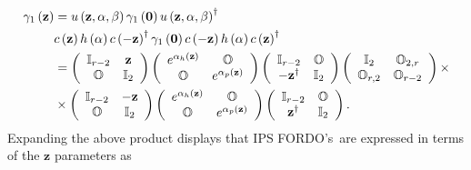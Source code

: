 \documentclass[aps,preprint]{revtex4}%
\begin{document}
\begin{align}
\gamma_{1}\left(  \mathbf{z}\right)   &  =u\left(  \mathbf{z,\alpha,\beta
}\right)  \gamma_{1}\left(  \mathbf{0}\right)  u\left(  \mathbf{z,\alpha
,\beta}\right)  ^{\dagger}\nonumber\\
&  c\left(  \mathbf{z}\right)  h\left(  \mathbf{\alpha}\right)  c\left(
-\mathbf{z}\right)  ^{\dagger}\gamma_{1}\left(  \mathbf{0}\right)  c\left(
-\mathbf{z}\right)  h\left(  \mathbf{\alpha}\right)  c\left(  \mathbf{z}%
\right)  ^{\dagger}\nonumber\\
&  =\left(
\begin{array}
[c]{cc}%
\mathbb{I}_{r-2} & \mathbf{z}\\
\mathbb{O} & \mathbb{I}_{2}%
\end{array}
\right)  \left(
\begin{array}
[c]{cc}%
e^{\mathbf{\alpha}_{h}\left(  \mathbf{z}\right)  } & \mathbb{O}\\
\mathbb{O} & e^{\mathbf{\alpha}_{p}\left(  \mathbf{z}\right)  }%
\end{array}
\right)  \left(
\begin{array}
[c]{cc}%
\mathbb{I}_{r-2} & \mathbb{O}\\
-\mathbf{z}^{\dagger} & \mathbb{I}_{2}%
\end{array}
\right)  \left(
\begin{array}
[c]{cc}%
\mathbb{I}_{2} & \mathbb{O}_{2,r}\\
\mathbb{O}_{r,2} & \mathbb{O}_{r-2}%
\end{array}
\right)  \times\nonumber\\
&  \times\left(
\begin{array}
[c]{cc}%
\mathbb{I}_{r-2} & -\mathbf{z}\\
\mathbb{O} & \mathbb{I}_{2}%
\end{array}
\right)  \left(
\begin{array}
[c]{cc}%
e^{\mathbf{\alpha}_{h}\left(  \mathbf{z}\right)  } & \mathbb{O}\\
\mathbb{O} & e^{\mathbf{\alpha}_{p}\left(  \mathbf{z}\right)  }%
\end{array}
\right)  \left(
\begin{array}
[c]{cc}%
\mathbb{I}_{r-2} & \mathbb{O}\\
\mathbf{z}^{\dagger} & \mathbb{I}_{2}%
\end{array}
\right)  .
\end{align}
Expanding the above product displays that IPS FORDO's\ are expressed in terms
of the $\mathbf{z}$ parameters as
\end{document}
